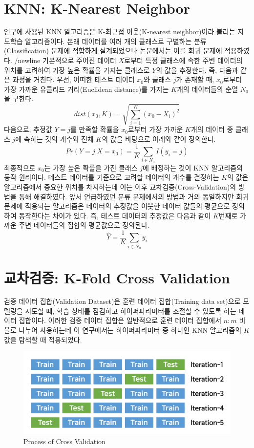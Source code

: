 \documentclass{article}
\begin{document}
\section{KNN: K-Nearest Neighbor}
연구에 사용된 KNN 알고리즘은 K-최근접 이웃(K-nearest neighbor)이라 불리는 지도학습 알고리즘이다. 본래 데이터를 여러 개의 클래스로 구별하는 분류(Classification) 문제에 적합하게 설계되었으나 논문에서는 이를 회귀 문제에 적용하였다. /newline
기본적으로 주어진 데이터 $X$로부터 특정 클래스에 속한 주변 데이터의 위치를 고려하여 가장 높은 확률을 가지는 클래스로 $Y$의 값을 추정한다. 즉, 다음과 같은 과정을 거친다. 우선, 어떠한 테스트 데이터 $x_0$와 클래스 $j$가 존재할 때, $x_0$로부터 가장 가까운 유클리드 거리(Euclidean distance)를 가지는 $K$개의 데이터들의 순열 $N_0$을 구한다.
\begin{equation}
dist(x_0, K)=\sqrt{\sum_{i=1}^{K}(x_0-X_i)^2}
\end{equation}
다음으로, 추정값 $Y=j$를 만족할 확률을 $x_0$로부터 가장 가까운 $K$개의 데이터 중 클래스 $j$에 속하는 것의 개수와 전체 $K$의 값을 바탕으로 아래와 같이 정의한다.
\begin{equation}
Pr(Y=j | X=x_0)=\frac{1}{K}\sum_{i \in N_0}I(y_i=j)
\end{equation}
최종적으로 $x_0$는 가장 높은 확률을 가진 클래스 $j$에 배정하는 것이 KNN 알고리즘의 동작 원리이다. 테스트 데이터를 기준으로 고려할 데이터의 개수를 결정하는 $K$의 값은 알고리즘에서 중요한 위치를 차지하는데 이는 이후 교차검증(Cross-Validation)의 방법을 통해 해결하였다.
앞서 언급하였던 분류 문제에서의 방법과 거의 동일하지만 회귀 문제에 적용되는 알고리즘은 데이터의 추정값을 이웃한 데이터 값들의 평균으로 정의하여 동작한다는 차이가 있다. 즉, 테스트 데이터의 추정값은 다음과 같이 $K$번째로 가까운 주변 데이터들의 집합의 평균값으로 정의된다.
\begin{equation}
\hat{Y}=\frac{1}{K}\sum_{i \in N_0}y_i
\end{equation}

\section{교차검증: K-Fold Cross Validation}
검증 데이터 집합(Validation Dataset)은 훈련 데이터 집합(Training data set)으로 모델링을 시도할 때, 학습 상태를 점검하고 하이퍼파라미터를 조절할 수 있도록 하는 데이터 집합이다. 이러한 검증 데이터 집합은 일반적으로 훈련 데이터 집합에서 $n:m$ 비율로 나누어 사용하는데 이 연구에서는 하이퍼파라미터 중 하나인 KNN 알고리즘의 $K$값을 탐색할 때 적용되었다.

\begin{figure}[h]
\centering
\includegraphics[scale=0.5]{./fig/Figure_1.png}
\caption{Process of Cross Validation}
\label{fig_1}
\end{figure}
\end{document}
